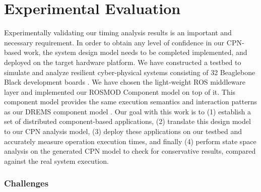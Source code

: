 \chapter{Experimental Evaluation}
\label{chapter:evaluation}

Experimentally validating our timing analysis results is an important and necessary requirement. In order to obtain any level of confidence in our CPN-based work, the system design model needs to be completed implemented, and deployed on the target hardware platform. We have constructed a testbed \cite{kumarTestbed} to simulate and analyze resilient cyber-physical systems consisting of 32 Beaglebone Black development boards \cite{BBB}. We have chosen the light-weight ROS \cite{ROS} middleware layer and implemented our ROSMOD Component model \cite{kumarROSMOD} on top of it. This component model provides the same execution semantics and interaction patterns as our DREMS component model \cite{ISIS_F6_ISORC:13}. Our goal with this work is to (1) establish a set of distributed component-based applications, (2) translate this design model to our CPN analysis model, (3) deploy these applications on our testbed and accurately measure operation execution times, and finally (4) perform state space analysis on the generated CPN model to check for conservative results, compared against the real system execution.

\subsection{Challenges}

